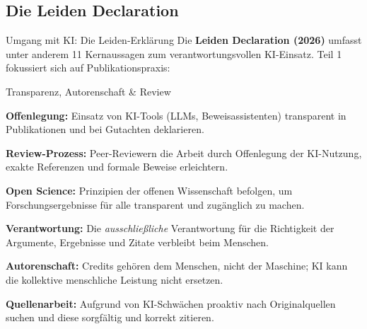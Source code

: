 \documentclass[aspectratio=\BeamerAspectRatio]{beamer}
\begin{document}
\subsection{Die Leiden Declaration}

\begin{frame}[fragile]{Umgang mit KI: Die Leiden-Erklärung}
    \footnotesize
    Die \textbf{Leiden Declaration (2026)} umfasst unter anderem 11 Kernaussagen zum verantwortungsvollen KI-Einsatz. Teil 1 fokussiert sich auf Publikationspraxis:

    \vspace{0pt}
    \begin{exampleblock}{Transparenz, Autorenschaft \& Review}
        \begin{description}\setlength{\itemsep}{0pt}
            \item[01] \textbf{Offenlegung:} Einsatz von KI-Tools (LLMs, Beweisassistenten) transparent in Publikationen und bei Gutachten deklarieren.
            \item[02] \textbf{Review-Prozess:} Peer-Reviewern die Arbeit durch Offenlegung der KI-Nutzung, exakte Referenzen und formale Beweise erleichtern.
            \item[03] \textbf{Open Science:} Prinzipien der offenen Wissenschaft befolgen, um Forschungsergebnisse für alle transparent und zugänglich zu machen.
            \item[04] \textbf{Verantwortung:} Die \textit{ausschließliche} Verantwortung für die Richtigkeit der Argumente, Ergebnisse und Zitate verbleibt beim Menschen.
            \item[05] \textbf{Autorenschaft:} Credits gehören dem Menschen, nicht der Maschine; KI kann die kollektive menschliche Leistung nicht ersetzen.
            \item[06] \textbf{Quellenarbeit:} Aufgrund von KI-Schwächen proaktiv nach Originalquellen suchen und diese sorgfältig und korrekt zitieren.
        \end{description}
    \end{exampleblock}
\end{frame}
\end{document}
